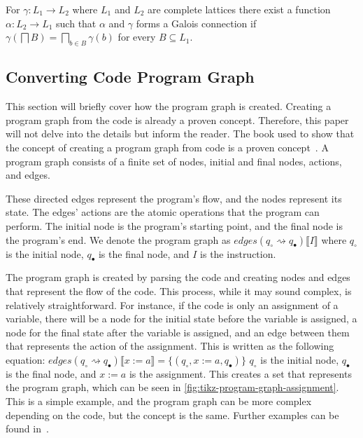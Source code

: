 \begin{theorem}\label{thm:galoispre}
    For $\gamma : L_1 \rightarrow L_2$ where $L_1$ and $L_2$ are complete lattices there exist a function $\alpha : L_2 \rightarrow L_1$ such that $\alpha$ and $\gamma$ forms a Galois connection if $\gamma\left(\bigsqcap B\right) = \bigsqcap_{b \in B}\gamma(b)$ for every $B \subseteq L_1$.
\end{theorem}

\subsection{Converting Code Program Graph}\label{subsec:converting-code-program-graph}
This section will briefly cover how the program graph is created.
Creating a program graph from the code is already a proven concept.
Therefore, this paper will not delve into the details but inform the reader.
The book used to show that the concept of creating a program graph from code is a proven concept~\cite[see][chap 2.2]{nielson_formal_2019}.
A program graph consists of a finite set of nodes, initial and final nodes, actions, and edges.

These directed edges represent the program's flow, and the nodes represent its state.
The edges' actions are the atomic operations that the program can perform.
The initial node is the program's starting point, and the final node is the program's end.
We denote the program graph as $edges(q_{\circ} \rightsquigarrow q_{\bullet})\llbracket I \rrbracket$ where $q_{\circ}$ is the initial node, $q_{\bullet}$ is the final node, and $I$ is the instruction.

The program graph is created by parsing the code and creating nodes and edges that represent the flow of the code. This process, while it may sound complex, is relatively straightforward. For instance, if the code is only an assignment of a variable, there will be a node for the initial state before the variable is assigned, a node for the final state after the variable is assigned, and an edge between them that represents the action of the assignment. This is written as the following equation:
$edges(q_{\circ} \rightsquigarrow q_{\bullet})\llbracket x:=a \rrbracket = \{(q_{\circ}, x:=a, q_{\bullet})\}$
$q_{\circ}$ is the initial node, $q_{\bullet}$ is the final node, and $x:=a$ is the assignment. This creates a set that represents the program graph, which can be seen in \autoref{fig:tikz-program-graph-assignment}. This is a simple example, and the program graph can be more complex depending on the code, but the concept is the same. Further examples can be found in~\cite[Figure 2.6]{nielson_formal_2019}.


